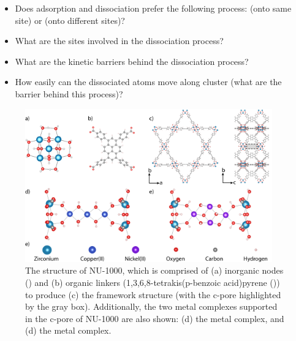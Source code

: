 \documentclass[journal=jctcce,manuscript=article]{achemso}
\begin{document}
\begin{itemize}
\begin{itemize}
        \begin{itemize}
            \item Does adsorption and dissociation prefer the following process:  (onto same site) or  (onto different sites)? 
            \item What are the sites involved in the dissociation process?
            \item What are the kinetic barriers behind the dissociation process?
            \item How easily can the dissociated  atoms move along cluster (what are the barrier behind this process)?
        \end{itemize}
    \end{itemize}
\end{itemize}

\begin{figure}[t]
    \centering
    \includegraphics[width=0.95\textwidth]{zi-images/00-General-Graphics/2020-07-31-Combined-MOF-Figure-final.png}
    \caption{The structure of NU-1000, which is comprised of (a)  inorganic nodes () and (b) organic linkers (1,3,6,8-tetrakis(p-benzoic acid)pyrene ()) to produce (c) the framework structure (with the c-pore highlighted by the gray box). Additionally, the two metal complexes supported in the c-pore of NU-1000 are also shown: (d) the  metal complex, and (d) the  metal complex.}
    \label{fig:MOFstructure}
\end{figure}

\newpage
\end{document}
